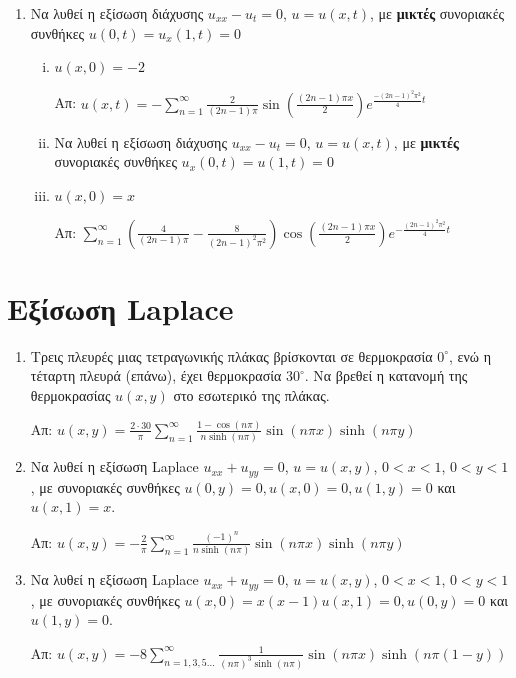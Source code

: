 \begin{enumerate}
	\item Να λυθεί η εξίσωση διάχυσης $ u_{xx} - u_t = 0 $, $ u=u(x,t) $, με \textbf{μικτές} συνοριακές συνθήκες $ u(0,t) = u_x(1,t) = 0 $ 

		\begin{enumerate}[(i)]
			\item $ u(x,0) = -2 $

				\hfill Απ: $ u(x,t) = -\sum_{n=1}^{\infty} \frac{ 2 }{ (2n-1)\pi } \sin{\left(\frac{
				(2n-1) \pi x }{ 2 }\right)} e^{\frac{-(2n-1)^{2}\pi^{2}}{4}t} $

	\item Να λυθεί η εξίσωση διάχυσης $ u_{xx} - u_t = 0 $, $ u=u(x,t) $, με \textbf{μικτές}
		συνοριακές συνθήκες $ u_x(0,t) = u(1,t) = 0 $ 

			\item $ u(x,0) = x $

				\hfill Απ: $ \sum_{n=1}^{\infty} (\frac{ 4 }{ (2n-1) \pi } - \frac{ 8 }{ (2n-1)^{2}
				\pi ^{2}}) \cos{(\frac{ (2n-1) \pi x }{ 2 })} e^{- \frac{ (2n-1)^{2} \pi ^2 }{ 4 } t} $


		\end{enumerate}



\end{enumerate}


\section{Εξίσωση \textlatin{Laplace}}

\begin{enumerate}

	\item Τρεις πλευρές μιας τετραγωνικής πλάκας βρίσκονται σε θερμοκρασία $ 0^{\circ} $, ενώ η
		τέταρτη πλευρά (επάνω), έχει θερμοκρασία $ 30^{\circ} $. Να βρεθεί η κατανομή της
		θερμοκρασίας $ u(x,y) $ στο εσωτερικό της πλάκας. 

		\hfill Απ: $u(x,y) = \frac{2\cdot 30}{\pi} \sum_{n=1}^{\infty} \frac{ 1 - \cos{(n\pi)} }{ n 
		\sinh{(n\pi)}}	\sin{(n\pi x)}\sinh{(n\pi y)} $

\item Να λυθεί η εξίσωση \textlatin{Laplace} $ u_{xx} + u_{yy} = 0 $, $u=u(x,y)$, $ 0<x<1 $, $ 0<y<1
	$, με συνοριακές συνθήκες $ u(0,y) = 0, u(x,0) = 0, u(1,y) = 0 $ και $ u(x,1) = x $. 


\hfill Απ: $ u(x,y) = - \frac{ 2 }{ \pi } \sum_{n=1}^{\infty}  \frac{ (-1)^{n} }{ n
		\sinh{(n\pi)} } \sin{(n\pi x)} \sinh{(n\pi y)}  $

\item Να λυθεί η εξίσωση \textlatin{Laplace} $ u_{xx} + u_{yy} = 0 $, $u=u(x,y)$, $ 0<x<1 $, $ 0<y<1
	$, με συνοριακές συνθήκες $ u(x,0) = x(x-1)  u(x,1) = 0, u(0,y) = 0 $ και $ u(1,y) = 0 $. 
	
	\hfill Απ: $ u(x,y) = - 8 \sum_{n=1,3,5\ldots}^{\infty}  \frac{ 1} { (n\pi)^{3} \sinh{(n\pi)}
	} \sin{(n\pi x)} \sinh{(n \pi (1-y))} $
\end{enumerate}



